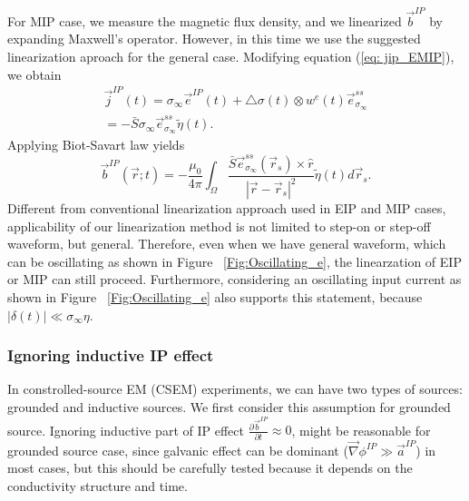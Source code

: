\documentclass[a4paper, 11pt]{article}
\newcommand{\grad}{\vec \nabla}
\newcommand{\siginf}{\sigma_\infty}
\newcommand{\dsig}{\triangle\sigma}
\renewcommand {\j}  { {\vec j} }
\renewcommand {\b}  { {\vec b} }
\newcommand {\e}  { {\vec e} }
\newcommand{\peta}{\tilde{\eta}}
\begin{document}
For MIP case, we measure the magnetic flux density, and we linearized $\b^{IP}$ by expanding Maxwell's operator. However, in this time we use the suggested linearization aproach for the general case. Modifying equation (\ref{eq: jip_EMIP}), we obtain
\begin{eqnarray}
    \j^{IP}(t) = \siginf\e^{IP}(t) + \dsig(t)\otimes w^e(t)\e^{ss}_{\siginf} \nonumber \\
            = -\bar{S}\siginf\e^{ss}_{\siginf}\peta(t).
\end{eqnarray}
Applying Biot-Savart law yields
\begin{equation}
  \b^{IP}(\vec{r}; t) = -\frac{\mu_0}{4\pi}\int_{\Omega}  \frac{\bar{S}\e^{ss}_{\siginf}(\vec{r}_s)\times\hat{r}}{|\vec{r}-\vec{r}_s|^2}\peta(t)d\vec{r}_s.
  \label{eq: BiotbIP_ss}
\end{equation}
Different from conventional linearization approach used in EIP and MIP cases, applicability of our linearization method is not limited to step-on or step-off waveform, but general. Therefore, even when we have general waveform, which can be oscillating as shown in Figure ~\ref{Fig:Oscillating_e}, the linearzation of EIP or MIP can still proceed. Furthermore, considering an oscillating input current as shown in Figure ~\ref{Fig:Oscillating_e} also supports this statement, because $|\delta(t)| \ll \siginf\eta$.

\subsubsection{Ignoring inductive IP effect}

In constrolled-source EM (CSEM) experiments, we can have two types of sources: grounded and inductive sources. We first consider this assumption for grounded source. Ignoring inductive part of IP effect $\frac{\partial \b^{IP}}{\partial t}\approx 0$, might be reasonable for grounded source case, since galvanic effect can be dominant ($\grad\phi^{IP} \gg \vec{a}^{IP}$) in most cases, but this should be carefully tested because it depends on the conductivity structure and time. 
\end{document}
